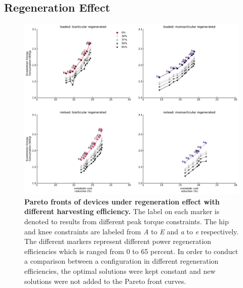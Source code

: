 \documentclass[10pt,letterpaper]{article}
\begin{document}
\subsection*{Regeneration Effect}
\begin{figure}[t!]   
	\centering
	\includegraphics[width=\linewidth]{Pareto_Mass_Regenration_Figures/PaperFigure_Paretofront_Regeneration_Efficiency.pdf}
	\vspace{1mm}
	\caption{{\small\textbf{Pareto fronts of devices under regeneration effect with different harvesting efficiency.} The label on each marker is denoted to results from different peak torque constraints. The hip and knee constraints are labeled from {\it A} to {\it E} and {\it a} to {\it e} respectively. The different markers represent different power regeneration efficiencies which is ranged from 0 to 65 percent. In order to conduct a comparison between a configuration in different regeneration efficiencies, the optimal solutions were kept constant and new solutions were not added to the Pareto front curves. }}
	\label{Fig_Paretofronts_Regeneration_Efficiency_Comparison}
\end{figure}
\end{document}
